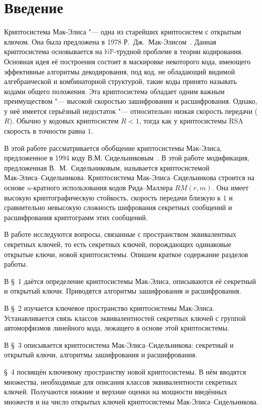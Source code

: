 \section*{Введение} 
Криптосистема Мак-Элиса "--- одна из старейших криптосистем с открытым ключом. Она была предложена в 1978
Р.~Дж.~Мак-Элисом~\cite{MCEliece}. Данная криптосистема
основывается на $\mathbf{\mathbb {NP}}$-трудной проблеме в теории
кодирования. Основная идея её построения  состоит в маскировке
некоторого кода, имеющего эффективные алгоритмы декодирования, под
код, не обладающий видимой алгебраической и комбинаторной
структурой, такие коды принято называть кодами общего положения.
Эта криптосистема обладает одним важным преимуществом "--- высокой
скоростью зашифрования и расшифрования. Однако, у неё имеется
серьёзный недостаток "--- относительно низкая скорость передачи
($R$). Обычно у кодовых криптосистем $R<1$, тогда как у
криптосистемы RSA скорость в точности равна $1$.

В этой работе рассматривается обобщение криптосистемы
Мак-Элиса, предложенное в 1994 коду В.М.
Сидельниковым~\cite{Sidelnikov1}. В этой работе модификация,
предложенная В.~М.~Сидельниковым, называется криптосистемой\\
Мак-Элиса--Сидельникова. Криптосистема Мак-Элиса--Сидельникова
строится на основе $u$-кратного использования кодов Рида--Маллера
$RM(r,m)$. Она имеет высокую криптографическую стойкость, скорость
передачи близкую к $1$ и сравнительно невысокую сложность
шифрования секретных сообщений и расшифрования криптограмм этих
сообщений.

В работе исследуются вопросы, связанные с пространством
эквивалентных секретных ключей, то есть секретных ключей,
порождающих одинаковые открытые ключи, новой криптосистемы. Опишем
краткое содержание разделов работы.

В \S~1 даётся определение криптосистемы Мак-Элиса, описываются её
секретный и открытый ключи. Приводятся алгоритмы зашифрования и
расшифрования.

В \S~2 изучается ключевое пространство криптосистемы Мак-Элиса.
Устанавливается связь классов эквивалентностей секретных ключей с
группой автоморфизмов линейного кода, лежащего в основе этой
криптосистемы.

В \S~3 описывается криптосистема Мак-Элиса--Сидельникова:
секретный и открытый ключи, алгоритмы зашифрования и
расшифрования.

\S~4 посвящён ключевому пространству новой криптосистемы. В нём
вводятся множества, необходимые для описания классов
эквивалентности секретных ключей. Получаются нижние и верхние
оценки на мощности  введённых множеств и на число открытых ключей
криптосистемы Мак-Элиса--Сидельникова.

